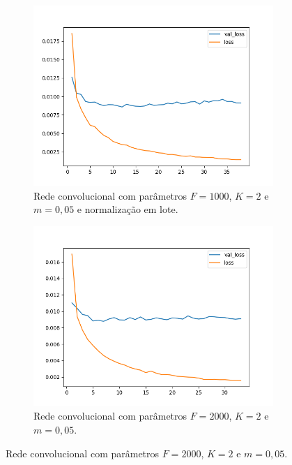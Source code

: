 \begin{figure}[H]
\begin{subfigure}{.5\textwidth}
  \label{fig:cnn-1000-k-2-m-005}
\end{subfigure}
\begin{subfigure}{.5\textwidth}
  \centering
  \caption{Rede convolucional com parâmetros $F = 1000$, $K = 2$ e $m = 0,05$ e normalização em lote.}
  \includegraphics[width=.8\linewidth]{figuras/ape-ajustes-hiper-parametros/cnn-with-bn-1000-k-2-m-005.png}
  
  \label{fig:cnn-1000-k-2-m-005-normalizacao-em-lote}
\end{subfigure}
\begin{subfigure}{.5\textwidth}
  \centering
  \caption{Rede convolucional com parâmetros $F = 2000$, $K = 2$ e $m = 0,05$.}
  \includegraphics[width=.8\linewidth]{figuras/ape-ajustes-hiper-parametros/cnn-2000-k-2-m-005.png}
  

\end{subfigure}
\end{figure}
